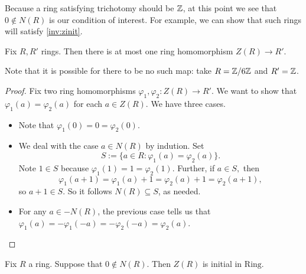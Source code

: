 \documentclass{article}
\begin{document}
Because a ring satisfying trichotomy should be $\mathbb Z$, at this point we see that $0\notin N(R)$ is our condition of interest. For example, we can show that such rings will satisfy \autoref{inv:zinit}.
\begin{lemma} \label{lem:atmostone}
	Fix $R,R'$ rings. Then there is at most one ring homomorphism $Z(R)\to R'.$
\end{lemma}
Note that it is possible for there to be no such map: take $R=\mathbb Z/6\mathbb Z$ and $R'=\mathbb Z$.
\begin{proof}
	Fix two ring homomorphisms $\varphi_1,\varphi_2:Z(R)\to R'.$ We want to show that $\varphi_1(a)=\varphi_2(a)$ for each $a\in Z(R).$ We have three cases.
	\begin{itemize}
		\item Note that $\varphi_1(0)=0=\varphi_2(0)$.
		\item We deal with the case $a\in N(R)$ by indution. Set
		\[S:=\{a\in R:\varphi_1(a)=\varphi_2(a)\}.\]
		Note $1\in S$ because $\varphi_1(1)=1=\varphi_2(1).$ Further, if $a\in S,$ then
		\[\varphi_1(a+1)=\varphi_1(a)+1=\varphi_2(a)+1=\varphi_2(a+1),\]
		so $a+1\in S$. So it follows $N(R)\subseteq S$, as needed.
		\item For any $a\in-N(R)$, the previous case tells us that $\varphi_1(a)=-\varphi_1(-a)=-\varphi_2(-a)=\varphi_2(a)$.
		\qedhere
	\end{itemize}
\end{proof}
\begin{proposition} \label{prop:trichimpliesinitial}
	Fix $R$ a ring. Suppose that $0\notin N(R)$. Then $Z(R)$ is initial in $\mathrm{Ring}$.
\end{proposition}
\end{document}
